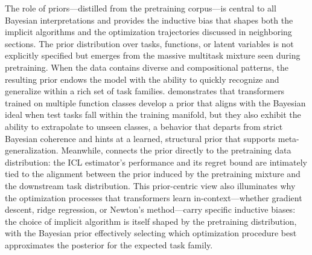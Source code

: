 \documentclass[11pt]{article}
\begin{document}
The role of priors---distilled from the pretraining corpus---is central to all Bayesian interpretations and provides the inductive bias that shapes both the implicit algorithms and the optimization trajectories discussed in neighboring sections. The prior distribution over tasks, functions, or latent variables is not explicitly specified but emerges from the massive multitask mixture seen during pretraining. When the data contains diverse and compositional patterns, the resulting prior endows the model with the ability to quickly recognize and generalize within a rich set of task families. \cite{ref2} demonstrates that transformers trained on multiple function classes develop a prior that aligns with the Bayesian ideal when test tasks fall within the training manifold, but they also exhibit the ability to extrapolate to unseen classes, a behavior that departs from strict Bayesian coherence and hints at a learned, structural prior that supports meta-generalization. Meanwhile, \cite{ref10} connects the prior directly to the pretraining data distribution: the ICL estimator's performance and its regret bound are intimately tied to the alignment between the prior induced by the pretraining mixture and the downstream task distribution. This prior-centric view also illuminates why the optimization processes that transformers learn in-context---whether gradient descent, ridge regression, or Newton's method---carry specific inductive biases: the choice of implicit algorithm is itself shaped by the pretraining distribution, with the Bayesian prior effectively selecting which optimization procedure best approximates the posterior for the expected task family.
\end{document}
